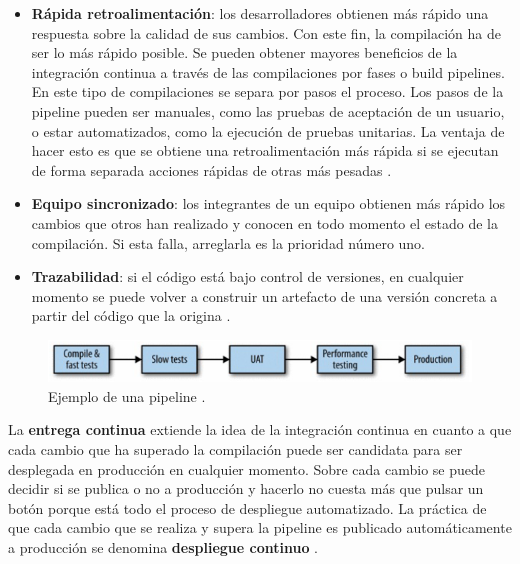 \documentclass[11pt,spanish,listoffigures]{tfgetsinf}
\begin{document}
\begin{itemize}

\item \textbf{Rápida retroalimentación}: los desarrolladores obtienen más rápido una respuesta sobre la calidad de sus cambios. Con este fin, la compilación ha de ser lo más rápido posible. Se pueden obtener mayores beneficios de la integración continua a través de las compilaciones por fases o build pipelines. En este tipo de compilaciones se separa por pasos el proceso. Los pasos de la pipeline pueden ser manuales, como las pruebas de aceptación de un usuario, o estar automatizados, como la ejecución de pruebas unitarias. La ventaja de hacer esto es que se obtiene una retroalimentación más rápida si se ejecutan de forma separada acciones rápidas de otras más pesadas \cite{Fowler2006}.

\item \textbf{Equipo sincronizado}: los integrantes de un equipo obtienen más rápido los cambios que otros han realizado y conocen en todo momento el estado de la compilación. Si esta falla, arreglarla es la prioridad número uno.

\item \textbf{Trazabilidad}: si el código está bajo control de versiones, en cualquier momento se puede volver a construir un artefacto de una versión concreta a partir del código que la origina \cite{Newman2015a}.

\end{itemize}

\begin{figure}[h]
\centering
\includegraphics[scale=1]{pipeline}
\caption{Ejemplo de una pipeline \cite{Newman2015a}.}
\end{figure}

La \textbf{entrega continua} extiende la idea de la integración continua en cuanto a que cada cambio que ha superado la compilación puede ser candidata para ser desplegada en producción en cualquier momento. Sobre cada cambio se puede decidir si se publica o no a producción y hacerlo no cuesta más que pulsar un botón porque está todo el proceso de despliegue automatizado. La práctica de que cada cambio que se realiza y supera la pipeline es publicado automáticamente a producción se denomina \textbf{despliegue continuo} \cite{Fowler2013}.
\end{document}
